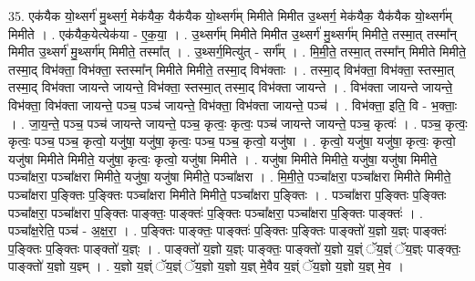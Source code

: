 \documentclass[17pt]{extarticle}
\begin{document}
35. एक॑यैक यो॒थ्सर्ग॑ मु॒थ्सर्ग॒ मेक॑यैक॒ यैक॑यैक यो॒थ्सर्ग॑म् मिमीते मिमीत उ॒थ्सर्ग॒ मेक॑यैक॒
यैक॑यैक यो॒थ्सर्ग॑म् मिमीते । . एक॑यैक॒येत्येक॑या - ए॒क॒या॒ । . उ॒थ्सर्ग॑म् मिमीते मिमीत उ॒थ्सर्ग॑ मु॒थ्सर्ग॑म् मिमीते॒ तस्मा॒त् तस्मा᳚न् मिमीत उ॒थ्सर्ग॑ मु॒थ्सर्ग॑म् मिमीते॒ तस्मा᳚त् । . उ॒थ्सर्ग॒मित्यु॑त् - सर्ग᳚म् । . मि॒मी॒ते॒ तस्मा॒त् तस्मा᳚न् मिमीते मिमीते॒ तस्मा॒द् विभ॑क्ता॒ विभ॑क्ता॒ स्तस्मा᳚न् मिमीते मिमीते॒ तस्मा॒द् विभ॑क्ताः । . तस्मा॒द् विभ॑क्ता॒ विभ॑क्ता॒ स्तस्मा॒त् तस्मा॒द् विभ॑क्ता जायन्ते जायन्ते॒ विभ॑क्ता॒ स्तस्मा॒त् तस्मा॒द् विभ॑क्ता जायन्ते । . विभ॑क्ता जायन्ते जायन्ते॒ विभ॑क्ता॒ विभ॑क्ता जायन्ते॒ पञ्च॒ पञ्च॑ जायन्ते॒ विभ॑क्ता॒ विभ॑क्ता जायन्ते॒ पञ्च॑ । . विभ॑क्ता॒ इति॒ वि - भ॒क्ताः॒ । . जा॒य॒न्ते॒ पञ्च॒ पञ्च॑ जायन्ते जायन्ते॒ पञ्च॒ कृत्वः॒ कृत्वः॒ पञ्च॑ जायन्ते जायन्ते॒ पञ्च॒ कृत्वः॑ । . पञ्च॒ कृत्वः॒ कृत्वः॒ पञ्च॒ पञ्च॒ कृत्वो॒ यजु॑षा॒ यजु॑षा॒ कृत्वः॒ पञ्च॒ पञ्च॒ कृत्वो॒ यजु॑षा । . कृत्वो॒ यजु॑षा॒ यजु॑षा॒ कृत्वः॒ कृत्वो॒ यजु॑षा मिमीते मिमीते॒ यजु॑षा॒ कृत्वः॒ कृत्वो॒ यजु॑षा मिमीते । . यजु॑षा मिमीते मिमीते॒ यजु॑षा॒ यजु॑षा मिमीते॒ पञ्चा᳚क्षरा॒ पञ्चा᳚क्षरा मिमीते॒ यजु॑षा॒ यजु॑षा मिमीते॒ पञ्चा᳚क्षरा । . मि॒मी॒ते॒ पञ्चा᳚क्षरा॒ पञ्चा᳚क्षरा मिमीते मिमीते॒ पञ्चा᳚क्षरा प॒ङ्क्तिः प॒ङ्क्तिः पञ्चा᳚क्षरा मिमीते मिमीते॒ पञ्चा᳚क्षरा प॒ङ्क्तिः । . पञ्चा᳚क्षरा प॒ङ्क्तिः प॒ङ्क्तिः पञ्चा᳚क्षरा॒ पञ्चा᳚क्षरा प॒ङ्क्तिः पाङ्क्तः॒ पाङ्क्तः॑ प॒ङ्क्तिः पञ्चा᳚क्षरा॒ पञ्चा᳚क्षरा प॒ङ्क्तिः पाङ्क्तः॑ । . पञ्चा᳚क्ष॒रेति॒ पञ्च॑ - अ॒क्ष॒रा॒ । . प॒ङ्क्तिः पाङ्क्तः॒ पाङ्क्तः॑ प॒ङ्क्तिः प॒ङ्क्तिः पाङ्क्तो॑ य॒ज्ञो य॒ज्ञ्ः पाङ्क्तः॑ प॒ङ्क्तिः प॒ङ्क्तिः पाङ्क्तो॑ य॒ज्ञ्ः । . पाङ्क्तो॑ य॒ज्ञो य॒ज्ञ्ः पाङ्क्तः॒ पाङ्क्तो॑ य॒ज्ञो य॒ज्ञ्ं ॅय॒ज्ञ्ं ॅय॒ज्ञ्ः पाङ्क्तः॒ पाङ्क्तो॑ य॒ज्ञो य॒ज्ञ्म् । . य॒ज्ञो य॒ज्ञ्ं ॅय॒ज्ञ्ं ॅय॒ज्ञो य॒ज्ञो य॒ज्ञ् मे॒वैव य॒ज्ञ्ं ॅय॒ज्ञो य॒ज्ञो य॒ज्ञ् मे॒व । \newline
\end{document}
